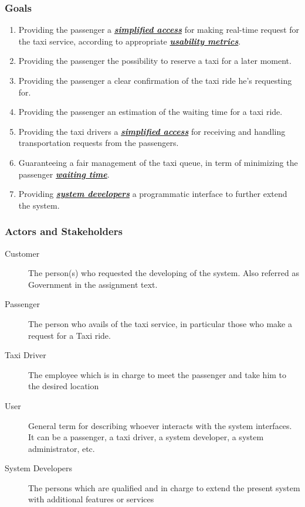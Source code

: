 \documentclass[11pt, a4paper,titlepage]{article}
\begin{document}
\subsubsection{Goals}
	\begin{enumerate}
	\item \label{itm:Goal_PassengerInterface} Providing the passenger a \textit{\textbf{\hyperref[itm:Desc_SimplifiedAccess]{simplified access}}} for making real-time request for the taxi service, according to appropriate \textit{\textbf{\hyperref[itm:Desc_UsabilityMetric]{usability metrics}}}.
	\item \label{itm:Goal_Reservation} Providing the passenger the possibility to reserve a taxi for a later moment.
	\item \label{itm:Goal_Confirmation} Providing the passenger a clear confirmation of the taxi ride he’s requesting for.
	\item \label{itm:Goal_WaitingTime} Providing the passenger an estimation of the waiting time for a taxi ride.
	\item \label{itm:Goal_TaxiInterface} Providing the taxi drivers a \textit{\textbf{\hyperref[itm:Desc_SimplifiedAccess]{simplified access}}} for receiving and handling transportation requests from the passengers.
	\item \label{itm:Goal_FairManagement} Guaranteeing a fair management of the taxi queue, in term of minimizing the passenger \textit{\textbf{\hyperref[itm:Desc_WaitingTime]{waiting time}}}.
	\item \label{itm:Goal_DeveloperInterface} Providing \textit{\textbf{\hyperref[itm:Actor_SysDevs]{system developers}}}  a programmatic interface to further extend the system.
		\end{enumerate}
\subsubsection{Actors and Stakeholders}
\begin{description}
	\item[Customer] \label{itm:Actor_Customer} The person(s) who requested the developing of the system. Also referred as Government in the assignment text.
	\item[Passenger] \label{itm:Actor_Passenger} The person who avails of the taxi service, in particular those who make a request for a Taxi ride.
	\item[Taxi Driver] \label{itm:Actor_TaxiDriver} The employee which is in charge to meet the passenger and take him to the desired location
	\item[User]\label{itm:Actor_User} General term for describing whoever interacts with the system interfaces. It can be a passenger, a taxi driver, a system developer, a system administrator, etc.
	\item[System Developers] \label{itm:Actor_SysDevs} The persons which are qualified and in charge to extend the present system with additional features or services
\end{description}
\end{document}
